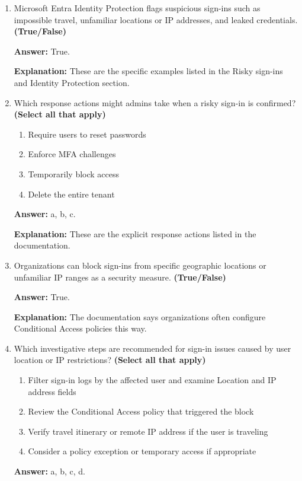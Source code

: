 \documentclass[10pt]{article}
\begin{document}
\begin{enumerate}[leftmargin=*]
\textbf{Explanation:} The documentation uses this exact example and resolution path.

\item Microsoft Entra Identity Protection flags suspicious sign-ins such as impossible travel, unfamiliar locations or IP addresses, and leaked credentials. \textbf{(True/False)}

\textbf{Answer:} True.

\textbf{Explanation:} These are the specific examples listed in the Risky sign-ins and Identity Protection section.

\item Which response actions might admins take when a risky sign-in is confirmed? \textbf{(Select all that apply)}
\begin{enumerate}[label=\alph*., leftmargin=1.5em]
\item Require users to reset passwords
\item Enforce MFA challenges
\item Temporarily block access
\item Delete the entire tenant
\end{enumerate}
\textbf{Answer:} a, b, c.

\textbf{Explanation:} These are the explicit response actions listed in the documentation.

\item Organizations can block sign-ins from specific geographic locations or unfamiliar IP ranges as a security measure. \textbf{(True/False)}

\textbf{Answer:} True.

\textbf{Explanation:} The documentation says organizations often configure Conditional Access policies this way.

\item Which investigative steps are recommended for sign-in issues caused by user location or IP restrictions? \textbf{(Select all that apply)}
\begin{enumerate}[label=\alph*., leftmargin=1.5em]
\item Filter sign-in logs by the affected user and examine Location and IP address fields
\item Review the Conditional Access policy that triggered the block
\item Verify travel itinerary or remote IP address if the user is traveling
\item Consider a policy exception or temporary access if appropriate
\end{enumerate}
\textbf{Answer:} a, b, c, d.


\end{enumerate}
\end{document}
